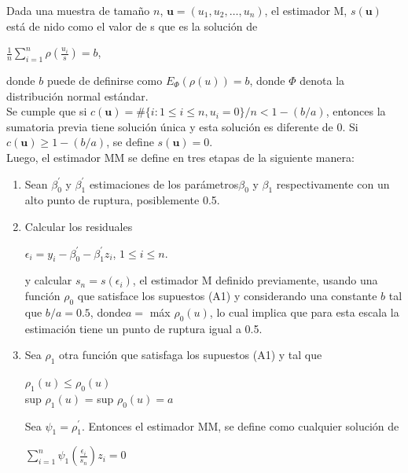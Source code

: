 Dada una muestra de tamaño $n$, $ \mathbf{u} = (u_{1}, u_{2}, \dots , u_{n})$,  el estimador M, $s(\mathbf{u})$ está de nido como el valor de s que es la solución de\\

\begin{center}
	$\frac{1}{n} \sum_{i=1}^{n} \rho( \frac{u_{i}}{s}) = b$,\\
\end{center}

donde $b$ puede de definirse como $E_{\Phi}(\rho(u)) = b$, donde $\Phi$ denota la distribución normal estándar.\\

Se cumple que si $c(\mathbf{u}) = \#\{i : 1 \leq i \leq n, u_{i}=0\} / n < 1- (b/a) $, entonces la sumatoria previa tiene solución única y esta solución es diferente de 0. Si $c(\mathbf{u}) \geq 1 -  (b/a)$, se define $s(\mathbf{u}) = 0$. \\

Luego, el estimador MM se define en tres etapas de la siguiente manera:\\

\begin{enumerate}
	\item Sean $ \beta_{0}^{'}$ y $ \beta_{1}^{'}$ estimaciones de los parámetros$ \beta_{0}$ y $ \beta_{1}$ respectivamente con un alto punto de ruptura, posiblemente 0.5.
	\item  Calcular los residuales\\
	\begin{center}
		 $ \epsilon_{i} = y_{i} -\beta_{0}^{'} -\beta_{1}^{'} z_{i}  $, $1 \leq i \leq n $.\\
	\end{center}
	
	y calcular $s_{n} = s(\epsilon_{i})$, el estimador M definido previamente, usando una función $\rho_{0}$ que satisface los supuestos (A1) y considerando una constante $b$ tal que $b/a = 0.5$, donde$ a = $ máx $ \rho_{0}(u)$, lo cual implica que para esta escala la estimación tiene un
	punto de ruptura igual a 0.5.
	
	\item  Sea $\rho_{1}$ otra función que satisfaga los supuestos (A1) y tal que\\
	\begin{center}
		$\rho_{1}(u) \leq \rho_{0}(u)$\\
		sup $\rho_{1}(u)$  = sup $ \rho_{0}(u) = a$\\
	\end{center}

	
	Sea $\psi_{1} = \rho_{1}^{'}$. Entonces el estimador MM, se define como cualquier solución de\\
	\begin{center}
		$\sum_{i=1}^{n} \psi_{1} (\frac{\epsilon_{i}}{s_{n}}) z_{i} = 0$\\
	\end{center}

\end{enumerate}



